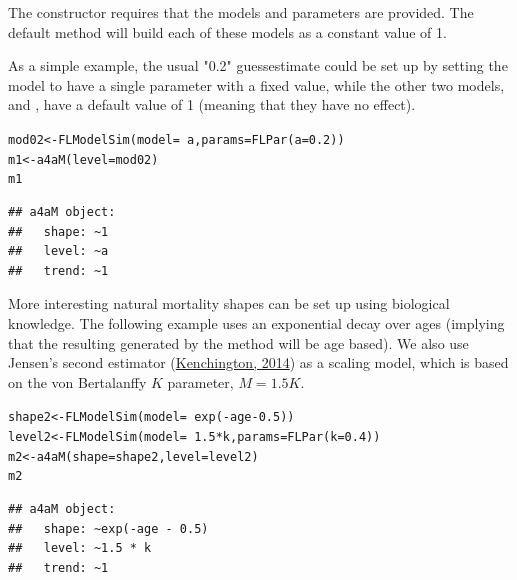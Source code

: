 \documentclass[a4paper,english,10pt]{article}\usepackage[]{graphicx}\usepackage[]{color}
\makeatletter
\newcommand{\hlnum}[1]{\textcolor[rgb]{0.063,0.58,0.627}{#1}}%
\newcommand{\hlopt}[1]{\textcolor[rgb]{0.196,0.196,0.196}{#1}}%
\newcommand{\hlstd}[1]{\textcolor[rgb]{0.196,0.196,0.196}{#1}}%
\newcommand{\hlkwb}[1]{\textcolor[rgb]{0.627,0,0.314}{#1}}%
\newcommand{\hlkwc}[1]{\textcolor[rgb]{0,0.631,0.314}{#1}}%
\newcommand{\hlkwd}[1]{\textcolor[rgb]{0.78,0.227,0.412}{#1}}%
\newenvironment{kframe}{%
 \def\at@end@of@kframe{}%
 \ifinner\ifhmode%
  \def\at@end@of@kframe{\end{minipage}}%
  \begin{minipage}{\columnwidth}%
 \fi\fi%
 \def\FrameCommand##1{\hskip\@totalleftmargin \hskip-\fboxsep
 \colorbox{shadecolor}{##1}\hskip-\fboxsep
     \hskip-\linewidth \hskip-\@totalleftmargin \hskip\columnwidth}%
 \MakeFramed {\advance\hsize-\width
   \@totalleftmargin\z@ \linewidth\hsize
   \@setminipage}}%
 {\par\unskip\endMakeFramed%
 \at@end@of@kframe}
\newenvironment{knitrout}{}{} %
\makeatother
\begin{document}
The  constructor requires that the models and parameters are provided. The default method will build each of these models as a constant value of 1.

As a simple example, the usual "0.2" guessestimate could be set up by setting the  model to have a single parameter with a fixed value, while the other two models,  and , have a default value of 1 (meaning that they have no effect).

\begin{knitrout}
\color{fgcolor}\begin{kframe}
\begin{alltt}
\hlstd{mod02} \hlkwb{<-} \hlkwd{FLModelSim}\hlstd{(}\hlkwc{model} \hlstd{=} \hlopt{~}\hlstd{a,} \hlkwc{params} \hlstd{=} \hlkwd{FLPar}\hlstd{(}\hlkwc{a} \hlstd{=} \hlnum{0.2}\hlstd{))}
\hlstd{m1} \hlkwb{<-} \hlkwd{a4aM}\hlstd{(}\hlkwc{level} \hlstd{= mod02)}
\hlstd{m1}
\end{alltt}
\begin{verbatim}
## a4aM object:
##   shape: ~1
##   level: ~a
##   trend: ~1
\end{verbatim}
\end{kframe}
\end{knitrout}

More interesting natural mortality shapes can be set up using biological knowledge. The following example uses an exponential decay over ages (implying that the resulting  generated by the  method will be age based). We also use Jensen's second estimator (\href{http://onlinelibrary.wiley.com/doi/10.1111/faf.12027/abstract}{Kenchington, 2014}) as a scaling  model, which is based on the von Bertalanffy $K$ parameter, $M=1.5K$. 

\begin{knitrout}
\color{fgcolor}\begin{kframe}
\begin{alltt}
\hlstd{shape2} \hlkwb{<-} \hlkwd{FLModelSim}\hlstd{(}\hlkwc{model} \hlstd{=} \hlopt{~}\hlkwd{exp}\hlstd{(}\hlopt{-}\hlstd{age} \hlopt{-} \hlnum{0.5}\hlstd{))}
\hlstd{level2} \hlkwb{<-} \hlkwd{FLModelSim}\hlstd{(}\hlkwc{model} \hlstd{=} \hlopt{~}\hlnum{1.5} \hlopt{*} \hlstd{k,} \hlkwc{params} \hlstd{=} \hlkwd{FLPar}\hlstd{(}\hlkwc{k} \hlstd{=} \hlnum{0.4}\hlstd{))}
\hlstd{m2} \hlkwb{<-} \hlkwd{a4aM}\hlstd{(}\hlkwc{shape} \hlstd{= shape2,} \hlkwc{level} \hlstd{= level2)}
\hlstd{m2}
\end{alltt}
\begin{verbatim}
## a4aM object:
##   shape: ~exp(-age - 0.5)
##   level: ~1.5 * k
##   trend: ~1
\end{verbatim}
\end{kframe}
\end{knitrout}
\end{document}

